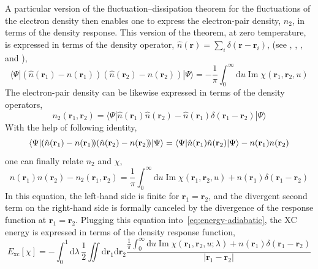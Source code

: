 A particular version of the fluctuation--dissipation theorem for the fluctuations of the electron density then enables one to express the electron-pair density, $n_2$, in terms of the density response.
This version of the theorem, at zero temperature, is expressed in terms of the density operator, $\hat n(\mathbf r)=\sum_i\delta(\mathbf r-\mathbf r_i)$, (see \citealp[eq.~4.8]{CallenPR51}, \citealp[eq.~124.10]{Landau80}, \citealp[eq.~8.6.2]{Parr89}, and \citealp[eq.~8]{KohnPRL98}),
\begin{equation}
  \langle\Psi|(\hat n(\mathbf r_1)-n(\mathbf r_1)\!)(\hat n(\mathbf r_2)-n(\mathbf r_2)\!)|\Psi\rangle=-\frac1\pi\int_0^\infty\mathrm du\operatorname{Im}\chi(\mathbf r_1,\mathbf r_2,u)
\end{equation}
The electron-pair density can be likewise expressed in terms of the density operators,
\begin{equation}
  n_2(\mathbf r_1,\mathbf r_2)=\langle\Psi|\hat n(\mathbf r_1)\hat n(\mathbf r_2)-\hat n(\mathbf r_1)\delta(\mathbf r_1-\mathbf r_2)|\Psi\rangle
\end{equation}
With the help of following identity,
\begin{equation}
  \langle\Psi|(\hat n(\mathbf r_1)-n(\mathbf r_1)\!)(\hat n(\mathbf r_2)-n(\mathbf r_2)\!)|\Psi\rangle \\
  =\langle\Psi|\hat n(\mathbf r_1)\hat n(\mathbf r_2)|\Psi\rangle-n(\mathbf r_1)n(\mathbf r_2)
\end{equation}
one can finally relate $n_2$ and $\chi$,
\begin{equation}
  n(\mathbf r_1)n(\mathbf r_2)-n_2(\mathbf r_1,\mathbf r_2)=\frac1\pi\int_0^\infty\mathrm du\operatorname{Im}\chi(\mathbf r_1,\mathbf r_2,u)+n(\mathbf r_1)\delta(\mathbf r_1-\mathbf r_2)
  \label{eq:fluctuation-dissipation}
\end{equation}
In this equation, the left-hand side is finite for $\mathbf r_1=\mathbf r_2$, and the divergent second term on the right-hand side is formally canceled by the divergence of the response function at $\mathbf r_1=\mathbf r_2$.
Plugging this equation into~\eqref{eq:energy-adiabatic}, the XC energy is expressed in terms of the density response function,
\begin{equation}
  E_\text{xc}[\chi]=-\int_0^1\mathrm d\lambda\,\frac12\iint\mathrm d\mathbf r_1\mathrm d\mathbf r_2\frac{\frac1\pi\int_0^\infty\mathrm du\operatorname{Im}\chi(\mathbf r_1,\mathbf r_2,u;\lambda)+n(\mathbf r_1)\delta(\mathbf r_1-\mathbf r_2)}{|\mathbf r_1-\mathbf r_2|}
\end{equation}
